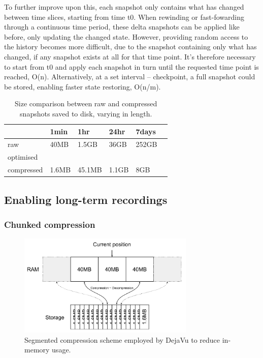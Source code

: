 To further improve upon this, each snapshot only contains what has changed between time slices, starting from time t0. When rewinding or fast-fowarding through a continuous time period, these delta snapshots can be applied like before, only updating the changed state. However, providing random access to the history becomes more difficult, due to the snapshot containing only what has changed, if any snapshot exists at all for that time point. It's therefore necessary to start from t0 and apply each snapshot in turn until the requested time point is reached, O(n). Alternatively, at a set interval -- checkpoint, a full snapshot could be stored, enabling faster state restoring, O(n/m).
\begin{table}[h]
\centering
\caption{Size comparison between raw and compressed snapshots saved to disk, varying in length.}
\begin{tabular}{|l|l|l|l|l|l|}
\hline
           & 1min  & 1hr    & 24hr  & 7days\\ \hline
raw        & 40MB  & 1.5GB  & 36GB  & 252GB\\ \hline
optimised  &&&&\\ \hline     
compressed & 1.6MB & 45.1MB & 1.1GB & 8GB\\ \hline
\end{tabular}
\label{tab:offline-storage}
\end{table}

\subsection{Enabling long-term recordings} %
\label{sub:enabling_long_term_recordings}

\subsubsection{Chunked compression} %
\label{sub:chunked_compression}
\begin{figure}[ht]
\centering
  \includegraphics[width=0.75\textwidth]{img/DejaVuCompression.pdf}
  \caption{Segmented compression scheme employed by DejaVu to reduce in-memory usage.}
  \label{fig:compression}
\end{figure}
